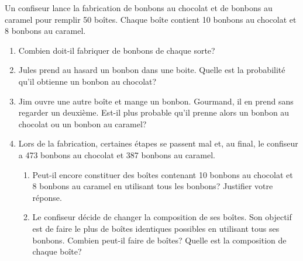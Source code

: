 
\medskip

Un confiseur lance la fabrication de bonbons au chocolat et de bonbons au
caramel pour remplir 50 boîtes. Chaque boîte contient 10 bonbons au chocolat et 8 bonbons au caramel.

\medskip

\begin{enumerate}
\item Combien doit-il fabriquer de bonbons de chaque sorte?
\item Jules prend au hasard un bonbon dans une boite. Quelle est la probabilité qu'il
obtienne un bonbon au chocolat?
\item Jim ouvre une autre boîte et mange un bonbon. Gourmand, il en prend sans regarder un
deuxième. Est-il plus probable qu'il prenne alors un bonbon au chocolat ou un bonbon au caramel?
\item Lors de la fabrication, certaines étapes se passent mal et, au final, le confiseur a 473 bonbons
au chocolat et 387 bonbons au caramel.
	\begin{enumerate}
		\item Peut-il encore constituer des boîtes contenant 10 bonbons au chocolat et 8 bonbons au
caramel en utilisant tous les bonbons? Justifier votre réponse.
		\item Le confiseur décide de changer la composition de ses boîtes. Son objectif est de faire le plus de boîtes identiques possibles en utilisant tous ses bonbons. Combien peut-il faire de boîtes?
Quelle est la composition de chaque boîte?
	\end{enumerate}
\end{enumerate}

\vspace{0,5cm}

